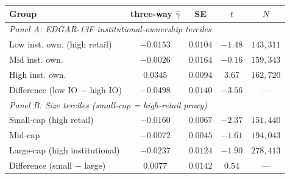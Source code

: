 \begin{tabular}{lcccc}
\hline\hline
Group & three-way $\hat\gamma$ & SE & $t$ & $N$ \\
\hline
\multicolumn{5}{l}{\textit{Panel A: EDGAR-13F institutional-ownership terciles}} \\
Low inst. own. (high retail) & $-0.0153$ & $0.0104$ & $-1.48$ & $143,311$ \\
Mid inst. own. & $-0.0026$ & $0.0164$ & $-0.16$ & $159,343$ \\
High inst. own. & $0.0345$ & $0.0094$ & $3.67$ & $162,720$ \\
\quad Difference (low IO $-$ high IO) & $-0.0498$ & $0.0140$ & $-3.56$ & --- \\
\hline
\multicolumn{5}{l}{\textit{Panel B: Size terciles (small-cap = high-retail proxy)}} \\
Small-cap (high retail) & $-0.0160$ & $0.0067$ & $-2.37$ & $151,440$ \\
Mid-cap & $-0.0072$ & $0.0045$ & $-1.61$ & $194,043$ \\
Large-cap (high institutional) & $-0.0237$ & $0.0124$ & $-1.90$ & $278,413$ \\
\quad Difference (small $-$ large) & $0.0077$ & $0.0142$ & $0.54$ & --- \\
\hline\hline
\end{tabular}
